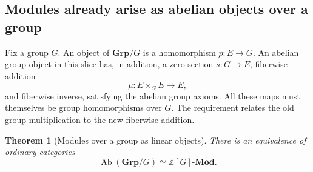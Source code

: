 \documentclass[11pt]{article}
\newtheorem{theorem}{Theorem}[section]
\theoremstyle{definition}
\theoremstyle{remark}\newtheorem{remark}[theorem]{Remark}
\begin{document}
\subsection{Modules already arise as abelian objects over a group}

Fix a group $G$.  An object of $\mathbf{Grp}/G$ is a homomorphism
$p:E\to G$.  An abelian group object in this slice has, in addition,
a zero section $s:G\to E$, fiberwise addition
\[
 \mu:E\times_G E\longrightarrow E,
\]
and fiberwise inverse, satisfying the abelian group axioms.  All these
maps must themselves be group homomorphisms over $G$.  The requirement
relates the old group multiplication to the new fiberwise addition.

\begin{theorem}[Modules over a group as linear objects]
\label{t:beck}
There is an equivalence of ordinary categories
\[
 \operatorname{Ab}(\mathbf{Grp}/G)
 \simeq \mathbb Z[G]\text{-}\mathbf{Mod}.
\]
\end{theorem}
\end{document}
